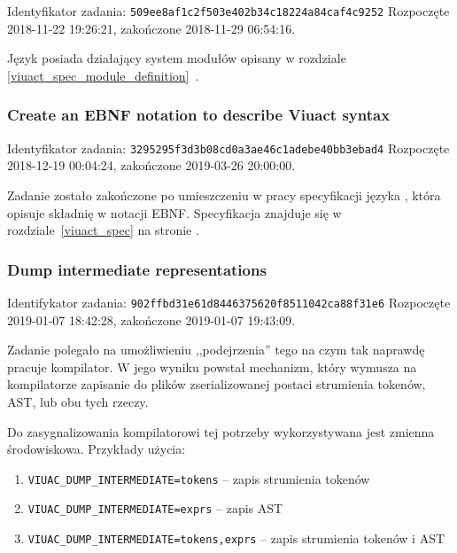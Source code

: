 Identyfikator zadania: \texttt{509ee8af1c2f503e402b34c18224a84caf4c9252}
\newline
Rozpoczęte 2018-11-22 19:26:21, zakończone 2018-11-29 06:54:16.
\newline

Język \ViuAct\phantom{} posiada działający system modułów opisany w rozdziale
\ref{viuact_spec_module_definition}~.

\subsubsection{Create an EBNF notation to describe Viuact syntax}

Identyfikator zadania: \texttt{3295295f3d3b08cd0a3ae46c1adebe40bb3ebad4}
\newline
Rozpoczęte 2018-12-19 00:04:24, zakończone 2019-03-26 20:00:00.
\newline

Zadanie zostało zakończone po umieszczeniu w pracy specyfikacji języka \ViuAct,
która opisuje składnię w notacji EBNF. Specyfikacja znajduje się w rozdziale~\ref{viuact_spec}
na stronie \pageref{viuact_spec}.

\subsubsection{Dump intermediate representations}

Identifykator zadania: \texttt{902ffbd31e61d8446375620f8511042ca88f31e6}
\newline
Rozpoczęte 2019-01-07 18:42:28, zakończone 2019-01-07 19:43:09.
\newline

Zadanie polegało na umożliwieniu ,,podejrzenia'' tego na czym tak naprawdę
pracuje kompilator. W jego wyniku powstał mechanizm, który wymusza na
kompilatorze zapisanie do plików zserializowanej postaci strumienia tokenów,
AST, lub obu tych rzeczy.

Do zasygnalizowania kompilatorowi tej potrzeby wykorzystywana jest zmienna
środowiskowa. Przykłady użycia:

\begin{enumerate}
    \item \texttt{VIUAC\_DUMP\_INTERMEDIATE=tokens} -- zapis strumienia tokenów
    \item \texttt{VIUAC\_DUMP\_INTERMEDIATE=exprs} -- zapis AST
    \item \texttt{VIUAC\_DUMP\_INTERMEDIATE=tokens,exprs} -- zapis strumienia
        tokenów i AST
\end{enumerate}


